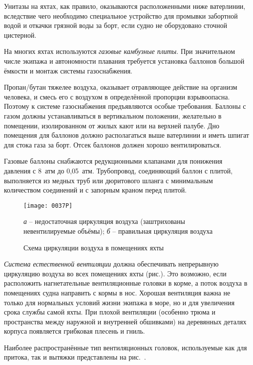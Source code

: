 Унитазы на яхтах, как правило, оказываются расположенными ниже
ватерлинии, вследствие чего необходимо специальное устройство для
промывки забортной водой и откачки грязной воды за борт, если судно не
оборудовано сточной цистерной.

На многих яхтах используются \textit{газовые камбузные
  плиты}. При значительном числе экипажа и
автономности плавания требуется установка баллонов большой ёмкости и
монтаж системы газоснабжения.

Пропан\-/бутан тяжелее воздуха, оказывает отравляющее действие на
организм человека, и смесь его с воздухом в определённой пропорции
взрывоопасна. Поэтому к системе газоснабжения предъявляются особые
требования. Баллоны с газом должны устанавливаться в вертикальном
положении, желательно в помещении, изолированном от жилых кают или на
верхней палубе. Дно помещения для баллонов должно располагаться выше
ватерлинии и иметь шпигат для стока газа за борт. Отсек баллонов
должен хорошо вентилироваться.

Газовые баллоны снабжаются редукционными клапанами для понижения
давления с 8~атм до 0,05~атм. Трубопровод, соединяющий баллон
с плитой, выполняется из медных труб или дюритового шланга с
минимальным количеством соединений и с запорным краном перед плитой.

\begin{figure}[htb]
  \centering
  \texttt{[image: 0037P]}
  \caption{Схема циркуляции воздуха в помещениях яхты}
  \label{fig:37}
  \small
  \centering{}
  \textit{а} \--- недостаточная циркуляция воздуха (заштрихованы невентилируемые объёмы); \textit{б} \--- правильная циркуляция воздуха
\end{figure}

\textit{Система естественной вентиляции}
должна обеспечивать непрерывную циркуляцию воздуха во всех помещениях
яхты (рис.). Это возможно, если расположить нагнетательные
вентиляционные головки в корме, а поток воздуха в помещениях судна
направить с кормы в нос. Хорошая вентиляция важна не только для
нормальных условий жизни экипажа в море, но и для увеличения срока
службы самой яхты. При плохой вентиляции (особенно трюма и
пространства между наружной и внутренней обшивками) на деревянных
деталях корпуса появляется грибковая плесень и гниль.

Наиболее распространённые тип вентиляционных головок, используемые как
для притока, так и вытяжки представлены на рис.~.

